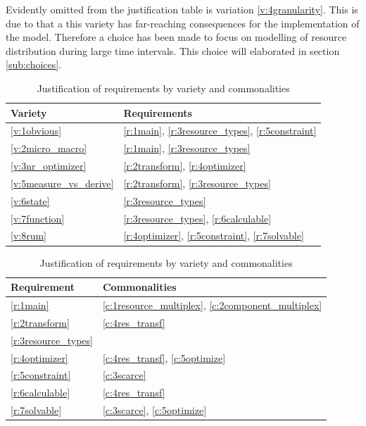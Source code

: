 Evidently omitted from the justification table is variation \ref{v:4granularity}. This is due to that a this variety has far-reaching consequences for the implementation of the model. Therefore a choice has been made to focus on modelling of resource distribution during large time intervals. This choice will elaborated in section \ref{sub:choices}.
\begin{table}
\centering
\begin{tabular}{|l|l|} \hline
Variety & Requirements \\ \hline
\ref{v:1obvious} & \ref{r:1main}, \ref{r:3resource_types}, \ref{r:5constraint}		\\ \hline
\ref{v:2micro_macro} & \ref{r:1main}, \ref{r:3resource_types} 	\\ \hline
\ref{v:3nr_optimizer} & \ref{r:2transform}, \ref{r:4optimizer} 	\\ \hline
\ref{v:5measure_vs_derive} & \ref{r:2transform}, \ref{r:3resource_types} \\ 	\hline
\ref{v:6state} & \ref{r:3resource_types} 	\\ \hline
\ref{v:7function} & \ref{r:3resource_types}, \ref{r:6calculable} 	\\ \hline
\ref{v:8rum} & \ref{r:4optimizer}, \ref{r:5constraint}, \ref{r:7solvable} 	\\ \hline
\end{tabular}
\hspace{24px}
\begin{tabular}{|l|l|} \hline
Requirement & Commonalities \\ \hline
\ref{r:1main} & \ref{c:1resource_multiplex}, \ref{c:2component_multiplex}	\\ \hline
\ref{r:2transform} & \ref{c:4res_transf}	\\ \hline
\ref{r:3resource_types} &	\\ \hline
\ref{r:4optimizer} & \ref{c:4res_transf}, \ref{c:5optimize} 	\\ \hline
\ref{r:5constraint} & \ref{c:3scarce}	\\ \hline
\ref{r:6calculable} & \ref{c:4res_transf}	\\ \hline
\ref{r:7solvable} & \ref{c:3scarce}, \ref{c:5optimize}	\\ \hline
\end{tabular}
\caption{Justification of requirements by variety and commonalities}
\label{table:justification}
\end{table}

